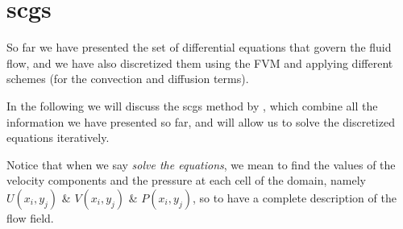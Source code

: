\section{\acrfull{scgs}}
\label{sec:scgs}

So far we have presented the set of differential equations that govern the fluid flow, and we have also discretized them using the FVM and applying different schemes (for the convection and diffusion terms).

In the following we will discuss the \acrfull{scgs} method by \cite[Vanka (1986)]{VANKA1986138}, which combine all the information we have presented so far, and will allow us to solve the discretized equations iteratively.

Notice that when we say \textit{solve the equations}, we mean to find the values of the velocity components and the pressure at each cell of the domain, namely $U(x_i, y_j)$ \& $V(x_i, y_j)$ \& $P(x_i, y_j)$, so to have a complete description of the flow field.









